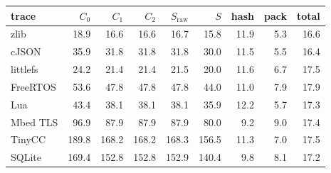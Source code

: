 \begin{tabular}{|l|r|r|r|r|r|r|r|r|}
\hline
trace & $C_0$ & $C_1$ & $C_2$ & $S_{\mathrm{raw}}$ & $S$ & hash & pack & total \\
\hline
zlib & 18.9 & 16.6 & 16.6 & 16.7 & 15.8 & 11.9 & 5.3 & 16.6 \\
cJSON & 35.9 & 31.8 & 31.8 & 31.8 & 30.0 & 11.5 & 5.5 & 16.4 \\
littlefs & 24.2 & 21.4 & 21.4 & 21.5 & 20.0 & 11.6 & 6.7 & 17.5 \\
FreeRTOS & 53.6 & 47.8 & 47.8 & 47.8 & 44.0 & 11.0 & 7.9 & 17.9 \\
Lua & 43.4 & 38.1 & 38.1 & 38.1 & 35.9 & 12.2 & 5.7 & 17.3 \\
Mbed TLS & 96.9 & 87.9 & 87.9 & 87.9 & 80.0 & 9.2 & 9.0 & 17.4 \\
TinyCC & 189.8 & 168.2 & 168.2 & 168.3 & 156.5 & 11.3 & 7.0 & 17.5 \\
SQLite & 169.4 & 152.8 & 152.8 & 152.9 & 140.4 & 9.8 & 8.1 & 17.2 \\
\hline
\end{tabular}
